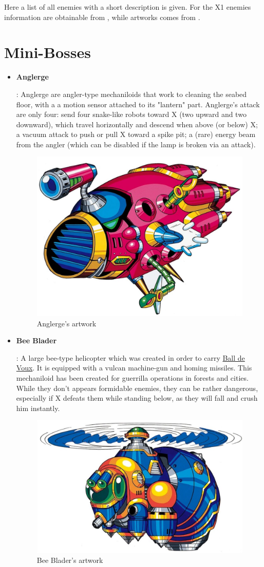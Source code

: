 Here a list of all enemies with a short description is given. For the X1 enemies information are obtainable from \cite{wayback:X_resources}, while artworks comes from \cite{book:MMX_Complete_art}.

\section{Mini-Bosses}
	\begin{itemize}
		\item \hypertarget{miniboss:Anglerge}{\textbf{Anglerge}}:
		Anglerge are angler-type mechaniloids that work to cleaning the seabed floor, with a  a motion sensor attached to its "lantern" part. Anglerge's attack are only four: send four snake-like robots toward X (two upward and two downward), which travel horizontally and descend when above (or below) X; a vacuum attack to push or pull X toward a spike pit; a (rare) energy beam from the angler (which can be disabled if the lamp is broken via an attack).
		\begin{figure}[htp]
			\centering
			\includegraphics[width=0.4\linewidth]{figures/X1/Enemies/Anglerge.jpg}
			\caption{Anglerge's artwork}
		\end{figure}
	
		\item \hypertarget{miniboss:Bee_Blader}{\textbf{Bee Blader}}:
		A large bee-type helicopter which was created in order to carry \hyperlink{enem:Ball_De_Voux}{Ball de Voux}. It is equipped with a vulcan machine-gun and homing missiles. This mechaniloid has been created for guerrilla operations in forests and cities. While they don't appears formidable enemies, they can be rather dangerous, especially if X defeats them while standing below, as they will fall and crush him instantly.
		\begin{figure}[htp]
			\centering
			\includegraphics[width=0.5\linewidth]{figures/X1/Enemies/BeeBlader.jpg}
			\caption{Bee Blader's artwork}
		\end{figure}
	

\end{itemize}

